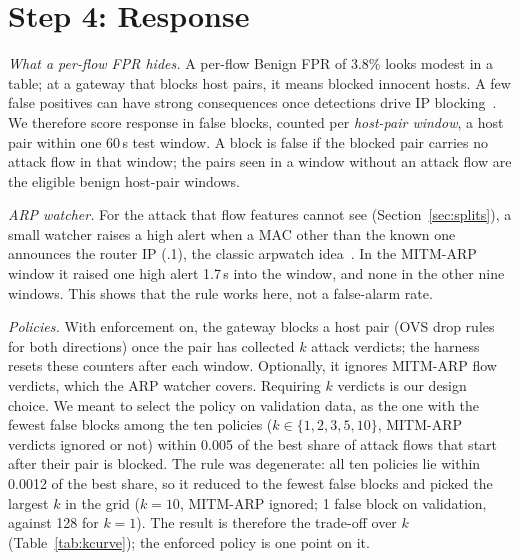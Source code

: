 \section{Step 4: Response}\label{sec:response}

\emph{What a per-flow FPR hides.} A per-flow Benign FPR of 3.8\% looks modest in a table; at a gateway that blocks host pairs, it means blocked innocent hosts. A few false positives can have strong consequences once detections drive IP blocking~\cite{garcia2023labeling,akbari2020atmos}. We therefore score response in false blocks, counted per \emph{host-pair window}, a host pair within one 60\,s test window. A block is false if the blocked pair carries no attack flow in that window; the pairs seen in a window without an attack flow are the eligible benign host-pair windows.

\emph{ARP watcher.} For the attack that flow features cannot see (Section~\ref{sec:splits}), a small watcher raises a high alert when a MAC other than the known one announces the router IP (.1), the classic arpwatch idea~\cite{arpwatch}. In the MITM-ARP window it raised one high alert 1.7\,s into the window, and none in the other nine windows. This shows that the rule works here, not a false-alarm rate.

\emph{Policies.} With enforcement on, the gateway blocks a host pair (OVS drop rules for both directions) once the pair has collected $k$ attack verdicts; the harness resets these counters after each window. Optionally, it ignores MITM-ARP flow verdicts, which the ARP watcher covers. Requiring $k$ verdicts is our design choice. We meant to select the policy on validation data, as the one with the fewest false blocks among the ten policies ($k\in\{1,2,3,5,10\}$, MITM-ARP verdicts ignored or not) within 0.005 of the best share of attack flows that start after their pair is blocked. The rule was degenerate: all ten policies lie within 0.0012 of the best share, so it reduced to the fewest false blocks and picked the largest $k$ in the grid ($k=10$, MITM-ARP ignored; 1 false block on validation, against 128 for $k=1$). The result is therefore the trade-off over $k$ (Table~\ref{tab:kcurve}); the enforced policy is one point on it.

